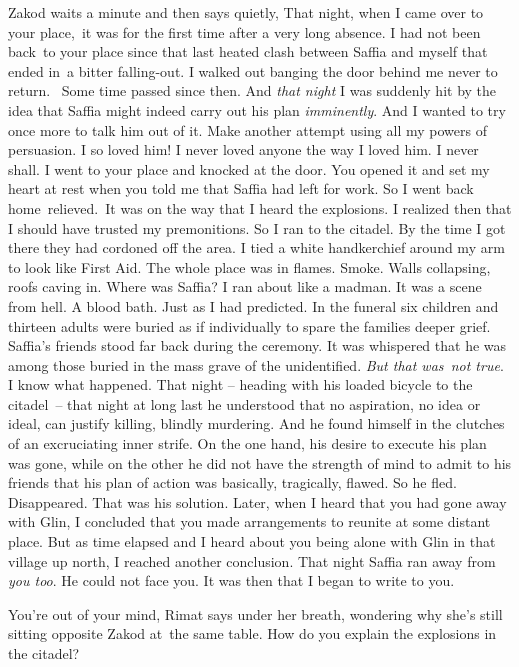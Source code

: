 \documentclass[twoside,11pt]{book}
\begin{document}
Zakod waits a minute and then says quietly, {\textquotedbl}That night, when I came over to your
place,{\ }it was for the first time after a very long absence. I had not been
back{\ }to your place since that last heated clash between Saffia and myself
that ended in~a bitter falling-out. I walked out banging the door behind me never to return. ~Some time passed since
then. And \textit{that night} I was suddenly hit by the idea that Saffia might indeed carry out his plan
\textit{imminently}. And I wanted to try once more to talk him out of it. Make another attempt using all my powers of
persuasion. I so loved him! I never loved anyone the way I loved him. I never shall. I went to your place and knocked
at the door. You opened it and set my heart at rest when you told me that Saffia had left for work. So I went back
home\ relieved.\  It was on the way that I heard the explosions. I realized then that I should have trusted my
premonitions. So I ran to the citadel. By the time I got there they had cordoned off the area. I tied a white
handkerchief around my arm to look like First Aid. The whole place was in flames. Smoke. Walls collapsing, roofs caving
in. Where was Saffia? I ran about like a madman. It was a scene from hell. A blood bath. Just as I had predicted. In
the funeral six children and thirteen adults were buried as if individually to spare the families deeper grief.
Saffia's friends stood far back during the ceremony. It was whispered that he was among those buried in the mass grave
of the unidentified. \textit{But that was~not true}. I know what happened. That night -- heading with his loaded
bicycle to the citadel\ {}-- that night at long last he understood that no aspiration, no idea or ideal, can justify
killing, blindly murdering. And he found himself in the clutches of an excruciating inner strife. On the one hand, his
desire to execute his plan was gone, while on the other he did not have the strength of mind to admit to his friends
that his plan of action was basically, tragically, flawed. So he fled. Disappeared. That was his solution. Later, when
I heard that you had gone away with Glin, I concluded that you made arrangements to reunite at some distant place. But
as time elapsed and I heard about you being alone with Glin in that village up north, I reached another conclusion.
That night Saffia ran away from\textit{ you too}. He could not face you. It was then that I began to write to
you.{\textquotedbl}\ 

{\textquotedbl}You're out of your mind,{\textquotedbl} Rimat says under her breath, wondering why she's still sitting
opposite Zakod at~the same table. {\textquotedbl}How do you explain the explosions in the citadel?{\textquotedbl} 
\end{document}
